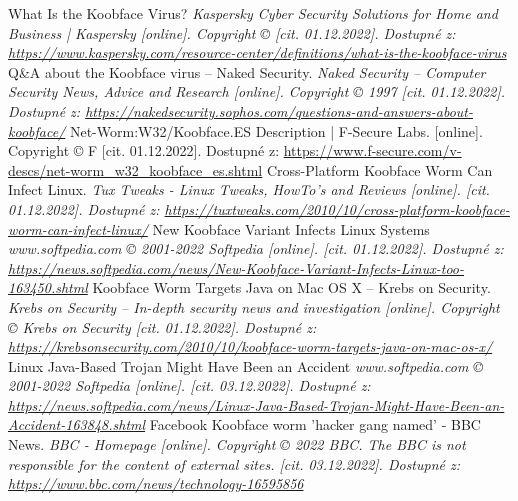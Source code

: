 \documentclass[a4paper,12pt]{article}
\begin{document}
{	
	{
		What Is the Koobface Virus?
		\it{Kaspersky Cyber Security Solutions for Home and Business | Kaspersky}
		[online]. Copyright © [cit. 01.12.2022].
		Dostupné z: \url{https://www.kaspersky.com/resource-center/definitions/what-is-the-koobface-virus}
	}
	{
		Q\&A about the Koobface virus – Naked Security.
		\it{Naked Security – Computer Security News, Advice and Research}
		[online]. Copyright © 1997 [cit. 01.12.2022].
		Dostupné z: \url{https://nakedsecurity.sophos.com/questions-and-answers-about-koobface/}
	}
	{
		Net-Worm:W32/Koobface.ES Description | F-Secure Labs.
		[online]. Copyright © F [cit. 01.12.2022].
		Dostupné z: \url{https://www.f-secure.com/v-descs/net-worm_w32_koobface_es.shtml}
	}
	{
		Cross-Platform Koobface Worm Can Infect Linux.
		\it{Tux Tweaks - Linux Tweaks, HowTo's and Reviews}
		[online]. [cit. 01.12.2022].
		Dostupné z: \url{https://tuxtweaks.com/2010/10/cross-platform-koobface-worm-can-infect-linux/}
	}
	{
		New Koobface Variant Infects Linux Systems
		\it{www.softpedia.com} © 2001-2022 Softpedia
		[online]. [cit. 01.12.2022].
		Dostupné z: \url{https://news.softpedia.com/news/New-Koobface-Variant-Infects-Linux-too-163450.shtml}
	}
	{
		Koobface Worm Targets Java on Mac OS X – Krebs on Security.
		\it{Krebs on Security – In-depth security news and investigation}
		[online]. Copyright © Krebs on Security [cit. 01.12.2022].
		Dostupné z: \url{https://krebsonsecurity.com/2010/10/koobface-worm-targets-java-on-mac-os-x/}
	}
	{
		Linux Java-Based Trojan Might Have Been an Accident
		\it{www.softpedia.com} © 2001-2022 Softpedia
		[online]. [cit. 03.12.2022].
		Dostupné z: \url{https://news.softpedia.com/news/Linux-Java-Based-Trojan-Might-Have-Been-an-Accident-163848.shtml}
	}
	{
		Facebook Koobface worm 'hacker gang named' - BBC News.
		\it{BBC - Homepage}
		[online]. Copyright © 2022 BBC. The BBC is not responsible for the content of external sites. [cit. 03.12.2022].
		Dostupné z: \url{https://www.bbc.com/news/technology-16595856}
	}
}

\end{document}
